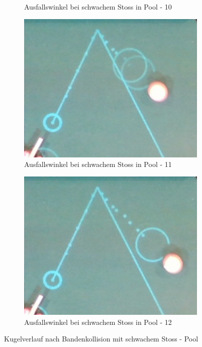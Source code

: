 \begin{figure}[h!]
\begin{subfigure}[b]{0.2\textwidth}
        \caption{Ausfallswinkel bei schwachem Stoss in Pool - 10}
        \label{fig:rebound_angle_slow_pool_10}
    \end{subfigure}
    \hfill
    \begin{subfigure}[b]{0.2\textwidth}
        \centering
        \includegraphics[width=1.0\linewidth]{../common/04_results/resources/simulation/rebound_angle_slow_pool/00_rail_rebound_angle_slow_pool_11.png}
        \caption{Ausfallswinkel bei schwachem Stoss in Pool - 11}
        \label{fig:rebound_angle_slow_pool_11}
    \end{subfigure}
    \hfill
    \begin{subfigure}[b]{0.2\textwidth}
        \centering
        \includegraphics[width=1.0\linewidth]{../common/04_results/resources/simulation/rebound_angle_slow_pool/00_rail_rebound_angle_slow_pool_12.png}
        \caption{Ausfallswinkel bei schwachem Stoss in Pool - 12}
        \label{fig:rebound_angle_slow_pool_12}
    \end{subfigure}
    \caption{Kugelverlauf nach Bandenkollision mit schwachem Stoss - Pool}
    \label{fig:kugelverlauf_nach_bandenkollision_mit_schwachem_stoss_pool}
\end{figure}


